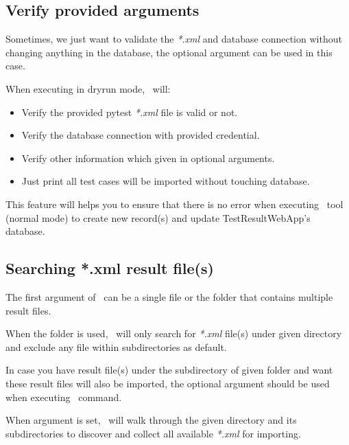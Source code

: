   \hypertarget{verify-provided-arguments}{%
  \subsection{Verify provided arguments}\label{verify-provided-arguments}}

    Sometimes, we just want to validate the \emph{*.xml} and database
    connection without changing anything in the database, the optional
    argument  can be used in this case.

    When executing in dryrun mode, \pkg\ will:

    \begin{itemize}
      \item
        Verify the provided pytest \emph{*.xml} file is valid or not.
      \item
        Verify the database connection with provided credential.
      \item
        Verify other information which given in optional arguments.
      \item
        Just print all test cases will be imported without touching database.
    \end{itemize}

    This feature will helps you to ensure that there is no error when
    executing \pkg\ tool (normal mode) to create new record(s) and
    update TestResultWebApp's database.

  \hypertarget{searching-.xml-result-files}{%
  \subsection{Searching *.xml result file(s)}}
  \label{searching-.xml-result-files}

    The first argument  of \pkg\ can be a single file or the 
    folder that contains multiple result files.

    When the folder is used, \pkg\ will only search for \emph{*.xml} file(s) 
    under given directory and exclude any file within subdirectories as default.

    In case you have result file(s) under the subdirectory of given folder and 
    want these result files will also be imported, the optional argument
     should be used when executing \pkg\ command.

    When  argument is set, \pkg\ will walk through the given 
    directory and its subdirectories to discover and collect all available 
    \emph{*.xml} for importing.

